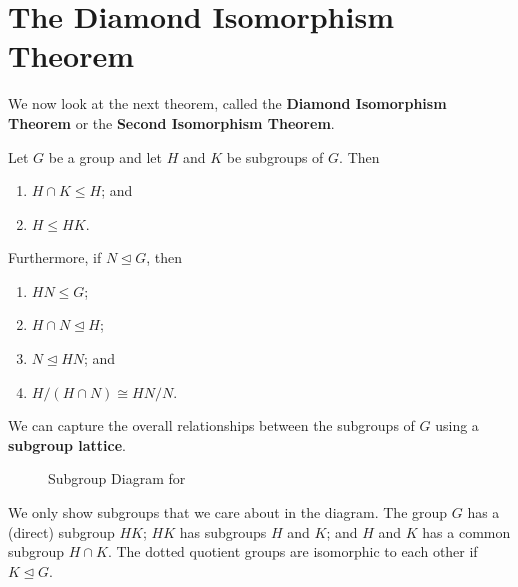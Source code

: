 \section{The Diamond Isomorphism Theorem}
We now look at the next theorem, called the \textbf{Diamond Isomorphism Theorem} or the \textbf{Second Isomorphism Theorem}.
\begin{theorem}\label{thrm-isomorphism-2}
    Let $G$ be a group and let $H$ and $K$ be subgroups of $G$. Then
    \begin{enumerate}
        \item $H \cap K \leq H$; and
        \item $H \leq HK$.
    \end{enumerate}
    Furthermore, if $N \unlhd G$, then
    \begin{enumerate}[start=3]
        \item $HN \leq G$;
        \item $H \cap N \unlhd H$;
        \item $N \unlhd HN$; and
        \item $H / (H\cap N) \cong HN / N$.
    \end{enumerate}
\end{theorem}
We can capture the overall relationships between the subgroups of $G$ using a \textbf{subgroup lattice}.
\begin{figure}[h]
    \centering
    \caption{Subgroup Diagram for }
\end{figure}

We only show subgroups that we care about in the diagram. The group $G$ has a (direct) subgroup $HK$; $HK$ has subgroups $H$ and $K$; and $H$ and $K$ has a common subgroup $H\cap K$. The dotted quotient groups are isomorphic to each other if $K \unlhd G$.

